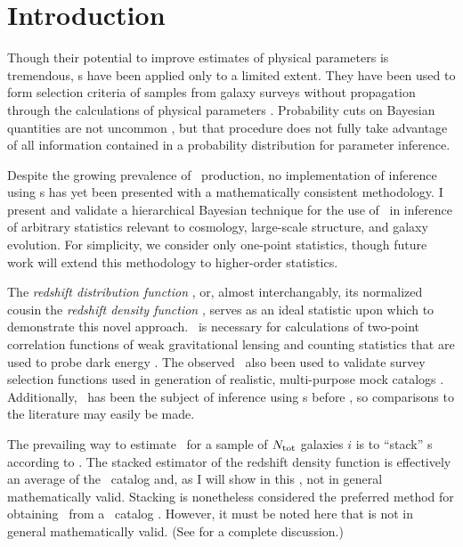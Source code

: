 \section{Introduction}

Though their potential to improve estimates of physical parameters is tremendous, \pzpdf s have been applied only to a limited extent.  
They have been used to form selection criteria of samples from galaxy surveys without propagation 
through the calculations of physical parameters \citep{VanBreukelen2009,Viironen2015}.  
Probability cuts on Bayesian quantities are not uncommon \citep{Leung2015, DiPompeo2015a}, but that procedure does not fully take advantage of all information contained in a probability distribution for parameter inference.  

Despite the growing prevalence of \pzpdf\ production, no implementation of inference using \pzpdf s has yet been presented with a mathematically consistent methodology.  
I present and validate a hierarchical Bayesian technique for the use of \pzpdf\ in inference of arbitrary statistics relevant to cosmology, large-scale structure, and galaxy evolution.  
For simplicity, we consider only one-point statistics, though future work will extend this methodology to higher-order statistics.

The \textit{redshift distribution function \Nz}, or, almost interchangably, its normalized cousin the \textit{redshift density function \nz}, serves as an ideal statistic upon which to demonstrate this novel approach.  
\Nz\ is necessary for calculations of two-point correlation functions of weak gravitational lensing and counting statistics that are used to probe dark energy \citep{Masters2015}.  
The observed \Nz\ also been used to validate survey selection functions used in generation of realistic, multi-purpose mock catalogs \citep{Norberg2002}.  
Additionally, \Nz\ has been the subject of inference using \pzpdf s before \citep{Sheldon2012, Hildebrandt2012, Kelly2014, Benjamin2013, Bonnett2015a, Viironen2015, Asorey2016, Leistedt2016}, so comparisons to the literature may easily be made. 

The prevailing way to estimate \nz\ for a sample of $N_{\mathrm{tot}}$ galaxies $i$ is to ``stack'' \pzpdf s according to .
The stacked estimator of the redshift density function is effectively an average of the \pzpdf\ catalog and, as I will show in this \paper, not in general mathematically valid.
Stacking is nonetheless considered the preferred method for obtaining \Nz\ from a \pzpdf\ catalog \citep{Sheldon2012, Kelly2014, Benjamin2013, Bonnett2015a, Viironen2015, Asorey2016}.  
However, it must be noted here that  is not in general mathematically valid.  
(See \citet{Hogg2012} for a complete discussion.)  

